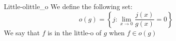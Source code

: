 \begin{definition}{Little-o}{little_o}
We define the following set:
\[
o \left( g \right) = \left\{ j : \lim_{ x \to 0 } \frac{j\left( x \right) }{g\left( x \right) } = 0  \right\} 
\]
We say that $ f $ is in the little-o of $ g $ when $ f \in  o\left( g \right)  $ 
\end{definition}
